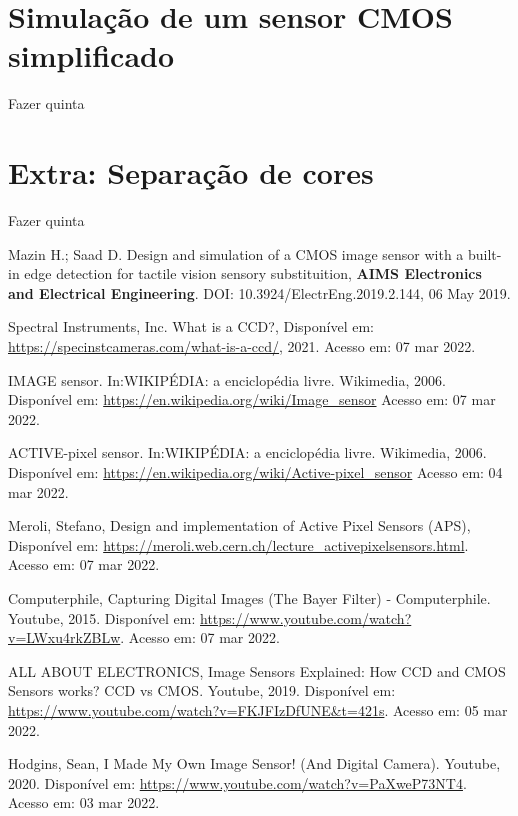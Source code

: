 \documentclass[11pt,a4paper,twocolumn]{article}
\begin{document}
	\section*{Simulação de um sensor CMOS simplificado}
	Fazer quinta	
	\section*{Extra: Separação de cores}
	Fazer quinta
	
	\begin{thebibliography}{99}
		{Mazin H.; Saad D. {Design and simulation of a CMOS image sensor with a built-in edge detection for tactile vision sensory substituition}, \textbf{AIMS Electronics and Electrical Engineering}. DOI: 10.3924/ElectrEng.2019.2.144, 06 May 2019.}
		
		{Spectral Instruments, Inc. {What is a CCD?}, Disponível em: \url{https://specinstcameras.com/what-is-a-ccd/}, 2021. Acesso em: 07 mar 2022.}
		
		{IMAGE sensor. In:WIKIPÉDIA: a enciclopédia livre. Wikimedia, 2006. Disponível em: \url{https://en.wikipedia.org/wiki/Image_sensor} Acesso em: 07 mar 2022.}

		{ACTIVE-pixel sensor. In:WIKIPÉDIA: a enciclopédia livre. Wikimedia, 2006. Disponível em: \url{https://en.wikipedia.org/wiki/Active-pixel_sensor} Acesso em: 04 mar 2022.}
		
		{Meroli, Stefano, {Design and implementation of Active Pixel Sensors (APS)}, Disponível em: \url{https://meroli.web.cern.ch/lecture_activepixelsensors.html}. Acesso em: 07 mar 2022.}
		
		{Computerphile, {Capturing Digital Images (The Bayer Filter) - Computerphile}. Youtube, 2015. Disponível em: \url{https://www.youtube.com/watch?v=LWxu4rkZBLw}. Acesso em: 07 mar 2022.}
		
		{ALL ABOUT ELECTRONICS, {Image Sensors Explained: How CCD and CMOS Sensors works? CCD vs CMOS}. Youtube, 2019. Disponível em: \url{https://www.youtube.com/watch?v=FKJFIzDfUNE&t=421s}. Acesso em: 05 mar 2022.}
		
		{Hodgins, Sean, {I Made My Own Image Sensor! (And Digital Camera)}. Youtube, 2020. Disponível em: \url{https://www.youtube.com/watch?v=PaXweP73NT4}. Acesso em: 03 mar 2022.}

	\end{thebibliography}
\end{document}
